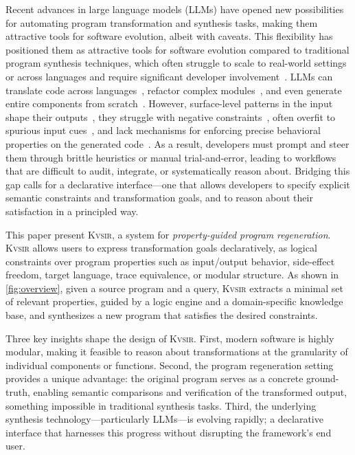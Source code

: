 \documentclass[sigplan,review,anonymous,10pt]{acmart}
\newcommand{\sys}{{\scshape Kv{\textalpha}sir}\xspace}
\begin{document}
Recent advances in large language models (LLMs) have opened new possibilities for automating program transformation and synthesis tasks, making them attractive tools for software evolution, albeit with caveats.
This flexibility has positioned them as attractive tools for software evolution
compared to traditional program synthesis techniques, which often struggle
to scale to real-world settings or across languages and require significant developer involvement~\cite{reynolds2019syguscomp,leino2016dafny,wu2023programming,dynamoth2016,cambronero2019active}.
LLMs can translate code across languages~\cite{ou2025enhancingllmbasedcodetranslation},
refactor complex modules~\cite{ziftci2025migrating},
and even generate entire components from scratch~\cite{huynh2025largelanguagemodelscode}.
However, surface-level patterns in the input shape their outputs~\cite{yang2025evaluatinggeneralizationcapabilitieslarge},
they struggle with negative constraints~\cite{hwang2024thinkpinkelephant,jiang2024llmsdreamelephantswhen},
often overfit to spurious input cues~\cite{xu2023llmfoolitselfpromptbased, wu2023deceptpromptexploitingllmdrivencode},
and lack mechanisms for enforcing precise behavioral properties on the generated code~\cite{roh2025breakthechainreasoningfailuresllms}.
As a result, developers must prompt and steer them through brittle heuristics or manual trial-and-error, leading to workflows that are difficult to audit, integrate, or systematically reason about.
Bridging this gap calls for a declarative interface---one that allows developers to specify explicit semantic constraints and transformation goals, and to reason about their satisfaction in a principled way.

This paper present \sys, a system for \emph{property-guided program regeneration}.
\sys allows users
to express transformation goals declaratively, as logical constraints over
program properties such as input/output behavior, side-effect freedom, target
language, trace equivalence, or modular structure.
As shown in \cref{fig:overview}, given a source program and
a query, \sys extracts a minimal set of relevant properties, guided by a
logic engine and a domain-specific knowledge base, and synthesizes a new
program that satisfies the desired constraints.

Three key insights shape the design of \sys.
First, modern software is highly modular, making it feasible to reason about transformations at the granularity of individual components or functions.
Second, the program regeneration setting provides a unique advantage: the original program serves as a concrete ground-truth, enabling semantic comparisons and verification of the transformed output, something impossible in traditional synthesis tasks.
Third, the underlying synthesis technology---particularly LLMs---is evolving rapidly; a declarative interface that harnesses this progress without disrupting the framework's end user.
\end{document}
